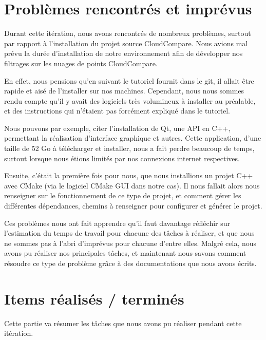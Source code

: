 \documentclass[12pt,titlepage,french]{article}
\begin{document}
\section{Problèmes rencontrés et imprévus \label{PB}}

Durant cette itération, nous avons rencontrés de nombreux problèmes, surtout par rapport à l'installation du projet source CloudCompare. Nous avions mal prévu la durée d'installation de notre environnement afin de développer nos filtrages sur les nuages de points CloudCompare.

En effet, nous pensions qu'en suivant le tutoriel fournit dans le git, il allait être rapide et aisé de l'installer sur nos machines. Cependant, nous nous sommes rendu compte qu'il y avait des logiciels très volumineux à installer au préalable, et des instructions qui n'étaient pas forcément expliqué dans le tutoriel.

Nous pouvons par exemple, citer l'installation de Qt, une API en C++, permettant la réalisation d'interface graphique et autres. Cette application, d'une taille de 52 Go à télécharger et installer, nous a fait perdre beaucoup de temps, surtout lorsque nous étions limités par nos connexions internet respectives.

Ensuite, c'était la première fois pour nous, que nous installions un projet C++ avec CMake (via le logiciel CMake GUI dans notre cas). Il nous fallait alors nous renseigner sur le fonctionnement de ce type de projet, et comment gérer les différentes dépendances, chemins à renseigner pour configurer et générer le projet.

Ces problèmes nous ont fait apprendre qu'il faut davantage réfléchir sur l'estimation du temps de travail pour chacune des tâches à réaliser, et que nous ne sommes pas à l'abri d'imprévus pour chacune d'entre elles. Malgré cela, nous avons pu réaliser nos principales tâches, et maintenant nous savons comment résoudre ce type de problème grâce à des documentations que nous avons écrits.

\section{Items réalisés / terminés\label{US}}

Cette partie va résumer les tâches que nous avons pu réaliser pendant cette itération.
\end{document}
